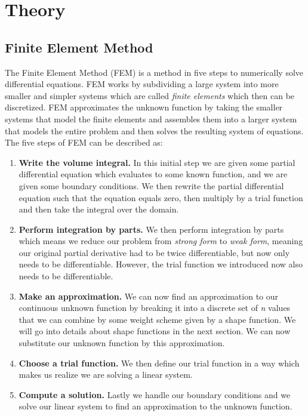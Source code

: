 \section{Theory}
\subsection{Finite Element Method}
The Finite Element Method (FEM) is a method in five steps to numerically solve differential equations. FEM works by subdividing a large system into more smaller and simpler systems which are called \textit{finite elements} which then can be discretized. FEM approximates the unknown function by taking the smaller systems that model the finite elements and assembles them into a larger system that models the entire problem and then solves the resulting system of equations. The five steps of FEM can be described as:
\begin{enumerate}
	\item \textbf{Write the volume integral.} In this initial step we are given some partial differential equation which evaluates to some known function, and we are given some boundary conditions. We then rewrite the partial differential equation such that the equation equals zero, then multiply by a trial function and then take the integral over the domain.
	\item \textbf{Perform integration by parts.} We then perform integration by parts which means we reduce our problem from \textit{strong form} to \textit{weak form}, meaning our original partial derivative had to be twice differentiable, but now only needs to be differentiable. However, the trial function we introduced now also needs to be differentiable.
	\item \textbf{Make an approximation.} We can now find an approximation to our continuous unknown function by breaking it into a discrete set of \textit{n} values that we can combine by some weight scheme given by a shape function. We will go into details about shape functions in the next section. We can now substitute our unknown function by this approximation.
	\item \textbf{Choose a trial function.} We then define our trial function in a way which makes us realize we are solving a linear system.
	\item \textbf{Compute a solution.} Lastly we handle our boundary conditions and we solve our linear system to find an approximation to the unknown function.
\end{enumerate}

